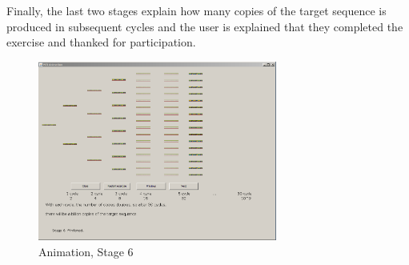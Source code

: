 \begin{frame}
Finally, the last two stages explain how many copies of the target sequence is produced in subsequent cycles and the user is explained that they completed the exercise and thanked for participation.

\begin{figure}[!t]
  \begin{center}
	\includegraphics[width=0.7\textwidth]{./img/AnimImpl/Stage6.png}
    \caption{
      \label{fig:AnimImpl:stage6}
      Animation, Stage 6
    }
  \end{center}
\end{figure}
\end{frame}
